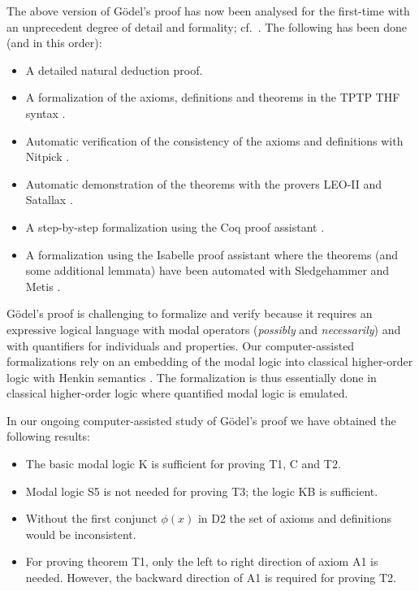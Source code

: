 \documentclass{llncs}
\begin{document}
\noindent
The above version of G\"{o}del's proof has now been 
analysed for the first-time
with an unprecedent degree of detail 
and formality; cf.~\cite{FormalTheologyRepository}. 
The following has been done (and in this order):
\begin{itemize}
\item A detailed natural deduction proof.
%
\item A formalization of the axioms, definitions and theorems in the TPTP THF syntax \cite{J22}.
%
\item Automatic verification of the consistency of the axioms and 
definitions with Nitpick \cite{Nitpick}.
%
\item Automatic demonstration of the theorems with the provers LEO-II \cite{LEO-II} and Satallax \cite{Satallax}.

\item A step-by-step formalization using the Coq proof assistant \cite{Coq}.

\item A formalization using the Isabelle proof assistant \cite{Isabelle} where the theorems (and some additional lemmata) have been automated with Sledgehammer \cite{Sledgehammer} and Metis \cite{Hurd03first-orderproof}.
\end{itemize}

G\"{o}del's proof is challenging to formalize and verify because it
requires an expressive logical language with modal operators
(\emph{possibly} and \emph{necessarily}) and with
quantifiers for individuals and properties.  Our computer-assisted formalizations rely on an
embedding of the modal logic into classical higher-order logic with
Henkin semantics \cite{J23,B9}. The formalization is thus essentially
done in classical higher-order logic where  quantified modal logic is
emulated.

In our ongoing computer-assisted study of G\"odel's proof we have
obtained the following results:
\begin{itemize}
\item The basic modal logic K is sufficient for proving T1, C and T2. 
\item Modal logic S5 is not needed for proving T3; the logic KB is
  sufficient. 
\item Without the first conjunct $\phi(x)$ in D2 the set of axioms 
  and definitions would be inconsistent.
\item For proving theorem T1, only the left to right direction of
  axiom A1 is needed. However, the backward direction of A1 is
  required for proving T2.

\end{itemize}
\end{document}
